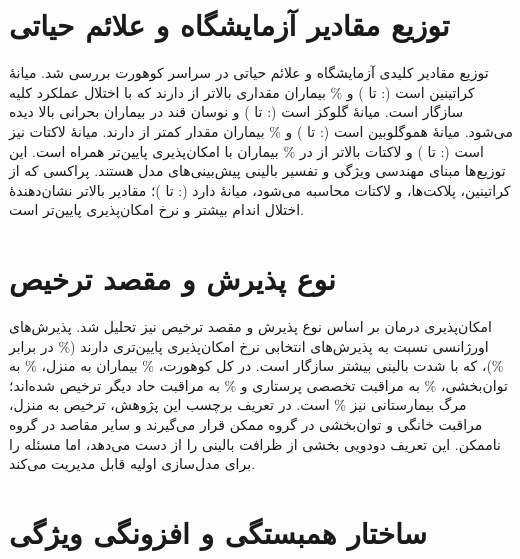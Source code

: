 \section{توزیع مقادیر آزمایشگاه و علائم حیاتی}

توزیع مقادیر کلیدی آزمایشگاه و علائم حیاتی در سراسر کوهورت بررسی شد. میانۀ کراتینین   است (:  تا ) و \% بیماران مقداری بالاتر از  دارند که با اختلال عملکرد کلیه سازگار است. میانۀ گلوکز   است (:  تا ) و نوسان قند در بیماران بحرانی بالا دیده می‌شود. میانۀ هموگلوبین   است (:  تا ) و \% بیماران مقدار کمتر از  دارند. میانۀ لاکتات نیز   است (:  تا ) و لاکتات بالاتر از  در \% بیماران با امکان‌پذیری پایین‌تر همراه است. این توزیع‌ها مبنای مهندسی ویژگی و تفسیر بالینی پیش‌بینی‌های مدل هستند. پراکسی  که از کراتینین، پلاکت‌ها،  و لاکتات محاسبه می‌شود، میانۀ  دارد (:  تا )؛ مقادیر بالاتر نشان‌دهندۀ اختلال اندام بیشتر و نرخ امکان‌پذیری پایین‌تر است.

\section{نوع پذیرش و مقصد ترخیص}

امکان‌پذیری درمان بر اساس نوع پذیرش و مقصد ترخیص نیز تحلیل شد. پذیرش‌های اورژانسی نسبت به پذیرش‌های انتخابی نرخ امکان‌پذیری پایین‌تری دارند (\% در برابر \%)، که با شدت بالینی بیشتر سازگار است. در کل کوهورت، \% بیماران به منزل، \% به توان‌بخشی، \% به مراقبت تخصصی پرستاری و \% به مراقبت حاد دیگر ترخیص شده‌اند؛ مرگ بیمارستانی نیز \% است. در تعریف برچسب این پژوهش، ترخیص به منزل، مراقبت خانگی و توان‌بخشی در گروه ممکن قرار می‌گیرند و سایر مقاصد در گروه ناممکن. این تعریف دودویی بخشی از ظرافت بالینی را از دست می‌دهد، اما مسئله را برای مدل‌سازی اولیه قابل مدیریت می‌کند.

\section{ساختار همبستگی و افزونگی ویژگی}

